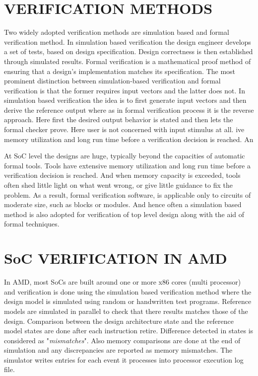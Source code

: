 \section{VERIFICATION METHODS}
Two widely adopted verification methods are simulation based and formal verification method. In simulation based verification the design engineer develops a set of tests, based on design specification. Design correctness is then established through simulated results. Formal verification is a mathematical proof method of ensuring that a design's implementation matches its specification. The most prominent distinction between simulation-based verification and formal verification is that the former requires input vectors and the latter does not. In simulation based verification the idea is to first generate input vectors and then derive the reference output where as in formal verification process it is the reverse approach. Here first the desired output behavior is stated and then lets the formal checker prove. Here user is not concerned with input stimulus at all. ive memory utilization and long run time before a verification decision is reached.  An

At SoC level the designs are huge, typically beyond the capacities of automatic formal tools. Tools have extensive memory utilization and long run time before a verification decision is reached.  And when memory capacity is exceeded, tools often shed little light on what went wrong, or give little guidance to fix the problem. As a result, formal verification software, is applicable only to circuits of moderate size, such as blocks or modules. And hence often a simulation based method is also adopted for verification of top level design along with the aid of formal techniques. 

\section{SoC VERIFICATION IN AMD}
In AMD, most SoCs are built around one or more x86 cores (multi processor) and verification is done using the simulation based verification method where the design model is simulated using random or handwritten test programs. Reference models are simulated in parallel to check that there results matches those of the design.  Comparison between the design architecture state and the reference model states are done after each instruction retire. Difference detected in states is considered as "{\it mismatches}". Also memory comparisons are done at the end of simulation and any discrepancies are reported as memory mismatches.  The simulator writes entries for each event it processes into processor execution log file. 


